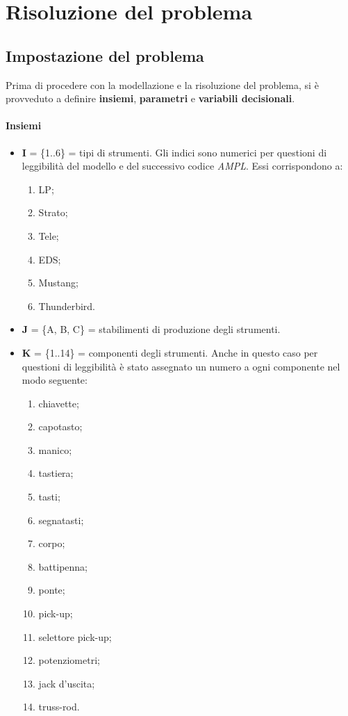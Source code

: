 \newpage
\section{Risoluzione del problema}
\subsection{Impostazione del problema}
Prima di procedere con la modellazione e la risoluzione del problema, si è provveduto a definire \textbf{insiemi}, \textbf{parametri} e \textbf{variabili decisionali}.
\paragraph*{Insiemi}
\begin{itemize}
\item[] \textbf{I} = \{1..6\} = tipi di strumenti. Gli indici sono numerici per questioni di leggibilità del modello e del successivo codice \textit{AMPL}. Essi corrispondono a:
\begin{enumerate}
\item LP;
\item Strato;
\item Tele;
\item EDS;
\item Mustang;
\item Thunderbird.
\end{enumerate}
\item[] \textbf{J} = \{A, B, C\} = stabilimenti di produzione degli strumenti. 
\item[] \textbf{K} = \{1..14\} = componenti degli strumenti. Anche in questo caso per questioni di leggibilità è stato assegnato un numero a ogni componente nel modo seguente:
\begin{enumerate}
\item chiavette;
\item capotasto;
\item manico;
\item tastiera;
\item tasti;
\item segnatasti;
\item corpo;
\item battipenna;
\item ponte;
\item pick-up;
\item selettore pick-up;
\item potenziometri;
\item jack d'uscita;
\item truss-rod.

\end{enumerate}
\end{itemize}
